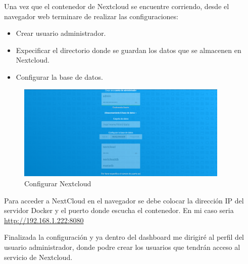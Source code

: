 			Una vez que el contenedor de Nextcloud se encuentre corriendo, desde el navegador web terminare de realizar las configuraciones:

			
			\begin{itemize}
				
				\item Crear usuario administrador.
				\item Expecificar el directorio donde se guardan los datos que se almacenen en Nextcloud.
				\item Configurar la base de datos.
				
			\end{itemize}
			
			\begin{figure}[ht]
				
				\centering
				
				\includegraphics[width=0.9\textwidth]{imagenes/docker/nextcloud/configurarNextcloud.png}
				
				\caption{Configurar Nextcloud}
				
				\label{fig:nextcloud}
				
			\end{figure}
			
			\pagebreak
			
			\begin{tcolorbox}[enhanced,frame style image=blueshade.png,opacityback=0.75,opacitybacktitle=0.25, colback=blue!5!white,colframe=blue!75!black,title=Nextcloud]
				Para acceder a NextCloud en el navegador se debe colocar la dirección IP del servidor Docker y el puerto donde escucha el contenedor. En mi caso seria \href{http://192.168.1.222:8080/}{\color{blue}http://192.168.1.222:8080}
			\end{tcolorbox}
			
			Finalizada la configuración y ya dentro del dashboard me dirigiré al perfil del usuario administrador, donde podre crear los usuarios que tendrán acceso al servicio de Nextcloud.
			
